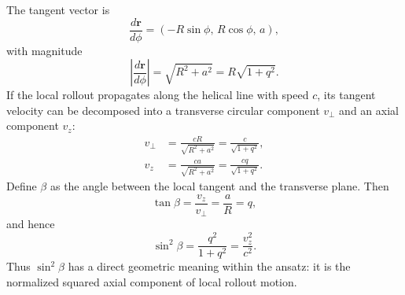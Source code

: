 \documentclass[aps,prd,reprint,nofootinbib,floatfix]{revtex4-2}
\begin{document}
The tangent vector is
\begin{equation}
\frac{d\bm r}{d\phi}=\left(-R\sin\phi,\,R\cos\phi,\,a\right),
\end{equation}
with magnitude
\begin{equation}
\left|\frac{d\bm r}{d\phi}\right|=\sqrt{R^2+a^2}=R\sqrt{1+q^2}.
\end{equation}
If the local rollout propagates along the helical line with speed $c$, its tangent velocity can be decomposed into a transverse circular component $v_\perp$ and an axial component $v_z$:
\begin{align}
v_\perp &= \frac{cR}{\sqrt{R^2+a^2}}=\frac{c}{\sqrt{1+q^2}},\\
v_z &= \frac{ca}{\sqrt{R^2+a^2}}=\frac{cq}{\sqrt{1+q^2}}.
\end{align}
Define $\beta$ as the angle between the local tangent and the transverse plane.  Then
\begin{equation}
\tan\beta=\frac{v_z}{v_\perp}=\frac{a}{R}=q,
\label{eq:betadef}
\end{equation}
and hence
\begin{equation}
\sin^2\beta=\frac{q^2}{1+q^2}=\frac{v_z^2}{c^2}.
\label{eq:sin2beta}
\end{equation}
Thus $\sin^2\beta$ has a direct geometric meaning within the ansatz: it is the normalized squared axial component of local rollout motion.
\end{document}
